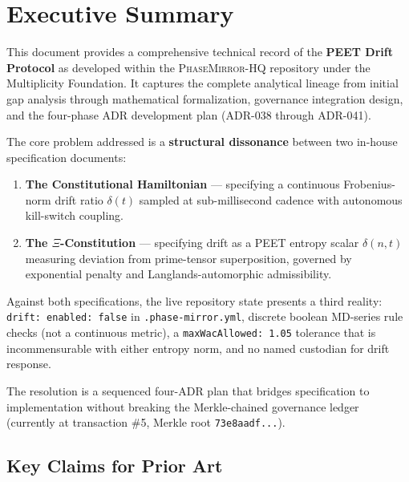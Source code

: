 \documentclass[11pt,letterpaper]{article}
\theoremstyle{definition}
\theoremstyle{remark}
\newcommand{\pmhq}{\textsc{PhaseMirror-HQ}}
\newcommand{\xicons}{\(\Xi\)-Constitution}
\begin{document}
\tableofcontents
\newpage

\section{Executive Summary}

This document provides a comprehensive technical record of the
\textbf{PEET Drift Protocol} as developed within the
\pmhq{} repository under the Multiplicity Foundation.
It captures the complete analytical lineage from initial gap analysis
through mathematical formalization, governance integration design,
and the four-phase ADR development plan (ADR-038 through ADR-041).

The core problem addressed is a \textbf{structural dissonance} between
two in-house specification documents:

\begin{enumerate}[leftmargin=2em]
  \item \textbf{The Constitutional Hamiltonian} --- specifying a
        continuous Frobenius-norm drift ratio \(\delta(t)\) sampled
        at sub-millisecond cadence with autonomous kill-switch coupling.
  \item \textbf{The \xicons{}} --- specifying drift as a PEET
        entropy scalar \(\delta(n,t)\) measuring deviation from
        prime-tensor superposition, governed by exponential penalty
        and Langlands-automorphic admissibility.
\end{enumerate}

Against both specifications, the live repository state presents
a third reality: \texttt{drift: enabled: false} in
\texttt{.phase-mirror.yml}, discrete boolean MD-series rule checks
(not a continuous metric), a \texttt{maxWacAllowed: 1.05} tolerance
that is incommensurable with either entropy norm, and no named
custodian for drift response.

The resolution is a sequenced four-ADR plan that bridges
specification to implementation without breaking the Merkle-chained
governance ledger (currently at transaction \#5, Merkle root
\texttt{73e8aadf...}).

\subsection*{Key Claims for Prior Art}
\end{document}
